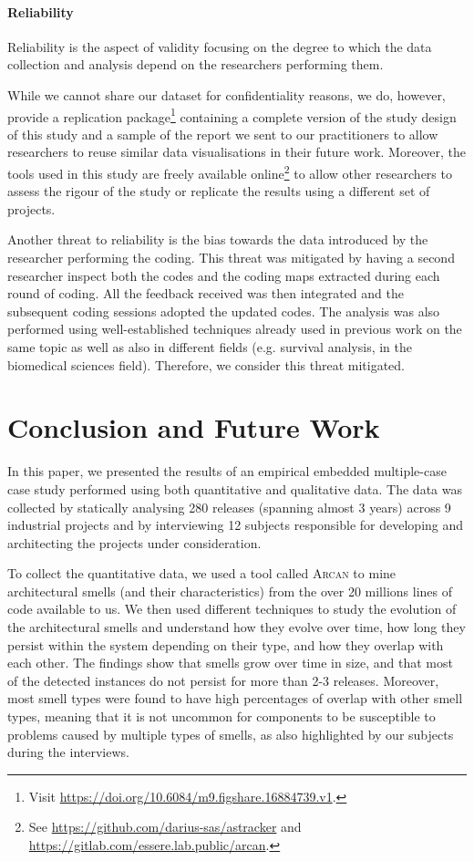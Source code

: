 \paragraph{Reliability}
Reliability is the aspect of validity focusing on the degree to which the data collection and analysis depend on the researchers performing them.

While we cannot share our dataset for confidentiality reasons, we do, however, provide a replication package\footnote{Visit \url{https://doi.org/10.6084/m9.figshare.16884739.v1}.} containing a complete version of the study design of this study and a sample of the report we sent to our practitioners to allow researchers to reuse similar data visualisations in their future work.
Moreover, the tools used in this study are freely available online\footnote{\label{fn:tools}See \url{https://github.com/darius-sas/astracker} and \url{https://gitlab.com/essere.lab.public/arcan}.} to allow other researchers to assess the rigour of the study or replicate the results using a different set of projects.

Another threat to reliability is the bias towards the data introduced by the researcher performing the coding.
This threat was mitigated by having a second researcher inspect both the codes and the coding maps extracted during each round of coding. All the feedback received was then integrated and the subsequent coding sessions adopted the updated codes.
The analysis was also performed using well-established techniques already used in previous work on the same topic as well as also in different fields (e.g. survival analysis, in the biomedical sciences field).
Therefore, we consider this threat mitigated.

\section{Conclusion and Future Work}\label{c4:sec:conclusion-fw}
In this paper, we presented the results of an empirical embedded multiple-case case study performed using both quantitative and qualitative data. 
The data was collected by statically analysing 280 releases (spanning almost 3 years) across 9 industrial projects and by interviewing 12 subjects responsible for developing and architecting the projects under consideration.

To collect the quantitative data, we used a tool called \textsc{Arcan} to mine architectural smells (and their characteristics) from the over 20 millions lines of code available to us.
We then used different techniques to study the evolution of the architectural smells and understand how they evolve over time, how long they persist within the system depending on their type, and how they overlap with each other.
The findings show that smells grow over time in size, and that most of the detected instances do not persist for more than 2-3 releases. 
Moreover, most smell types were found to have high percentages of overlap with other smell types, meaning that it is not uncommon for components to be susceptible to problems caused by multiple types of smells, as also highlighted by our subjects during the interviews.

